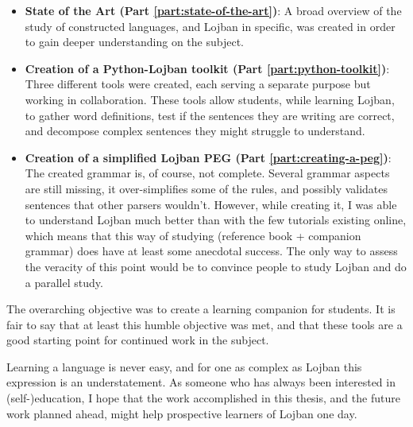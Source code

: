 \begin{itemize}
\item \textbf{State of the Art (Part \ref{part:state-of-the-art})}: A broad overview of the study of constructed languages, and Lojban
in specific, was created in order to gain deeper understanding on the subject.
\item \textbf{Creation of a Python-Lojban toolkit (Part \ref{part:python-toolkit})}: Three different tools were created, each
serving a separate purpose but working in collaboration. These tools allow students, while learning Lojban, to gather word definitions,
test if the sentences they are writing are correct, and decompose complex sentences they might struggle to understand.
\item \textbf{Creation of a simplified Lojban PEG (Part \ref{part:creating-a-peg})}: The created grammar is, of course, not complete.
Several grammar aspects are still missing, it over-simplifies some of the rules, and possibly validates sentences that other parsers wouldn't.
However, while creating it, I was able to understand Lojban much better than with the few tutorials existing online, which means that this way
of studying (reference book + companion grammar) does have at least some anecdotal success. The only way to assess the veracity of this point
would be to convince people to study Lojban and do a parallel study.
\end{itemize}

The overarching objective was to create a learning companion for students. It is fair to say that at least this humble objective was met,
and that these tools are a good starting point for continued work in the subject.\newline

Learning a language is never easy, and for one as complex as Lojban this expression is an understatement. As someone who has always been interested
in (self-)education, I hope that the work accomplished in this thesis, and the future work planned ahead, might help prospective
learners of Lojban one day.